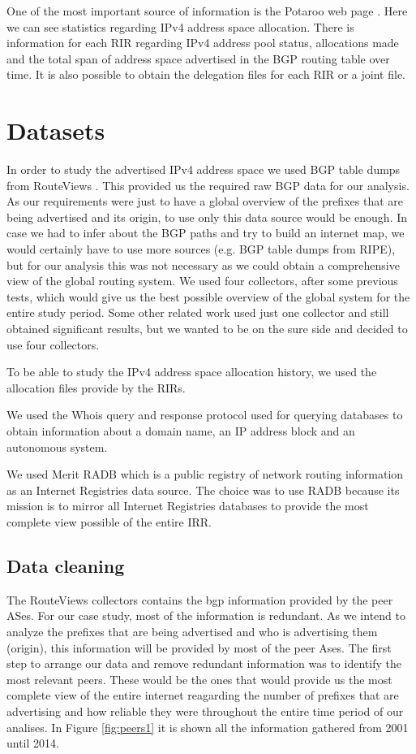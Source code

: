\documentclass[11pt,a4paper]{scrreprt}
\begin{document}
One of the most important source of information is the Potaroo web page \cite{Potaroo}. 
Here we can see statistics regarding IPv4 address space allocation. There is information for each RIR regarding IPv4 address pool status, allocations made and the total span of address space advertised in the BGP routing table over time. It is also possible to obtain the delegation files for each RIR or a joint file.


\chapter{Datasets}

In order to study the advertised IPv4 address space we used BGP table dumps from RouteViews \cite{RouteViews}. This provided us the required raw BGP data for our analysis. As our requirements were just to have a global overview of the prefixes that are being advertised and its origin, to use only this data source would be enough. In case we had to infer about the BGP paths and try to build an internet map, we would certainly have to use more sources (e.g. BGP table dumps from RIPE), but for our analysis this was not necessary as we could obtain a comprehensive view of the global routing system.
We used four collectors, after some previous tests, which would give us the best possible overview of the global system for the entire study period. Some other related work \cite{Address_Space_Deaggregation} used just one collector and still obtained significant results, but we wanted to be on the sure side and decided to use four collectors. 

To be able to study the IPv4 address space allocation history, we used the allocation files \cite{Potaroo} provide by the RIRs.

We used the Whois \cite{Whois} query and response protocol used for querying databases to obtain information about a domain name, an IP address block and an autonomous system. 

We used Merit RADB \cite{RADB} which is a public registry of network routing information as an Internet Registries data source. The choice was to use RADB because its mission is to mirror all Internet Registries  databases to provide the most complete view possible of the entire IRR. 

\section{Data cleaning}
The RouteViews collectors contains the bgp information provided by the peer ASes. For our case study, most of the information is redundant. As we intend to analyze the prefixes that are being advertised and who is advertising them (origin), this information will be provided by most of the peer Ases. The first step to arrange our data and remove redundant information was to identify the most relevant peers. These would be the ones that would provide us the most complete view of the entire internet reagarding the number of prefixes that are advertising and how reliable they were throughout the entire time period of our analises. In Figure \ref{fig:peers1} it is shown all the information gathered from 2001 until 2014. 
\end{document}
